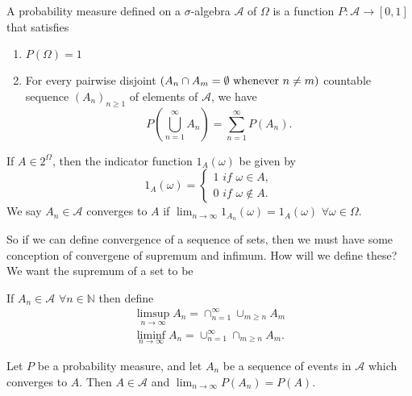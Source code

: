 \documentclass[../main.tex]{subfiles}
\begin{document}
\begin{definition}
A probability measure defined on a $ \sigma $-algebra $\mathcal{A}$ of $\Omega$ is a function $ P: \mathcal{A} \to [0,1] $ that satisfies 
\begin{enumerate}
    \item $P(\Omega)=1$
    \item For every pairwise disjoint $ (A_n \cap A_m = \emptyset \textnormal{ whenever } n \neq m) $ countable sequence $ (A_n)_{n \geq 1} $ of elements of $\mathcal{A}$, we have 
    \[
    P\left(\bigcup^\infty_{n=1}{A_n}\right) = \sum^\infty_{n=1}{P(A_n)}.
    \]
\end{enumerate}
\end{definition}







\begin{definition}
If $A \in 2^\Omega$, then the indicator function $1_A(\omega)$ be given by
\[
1_A(\omega) = 
\begin{cases}
    1 \textit{ if } \omega \in A,\\
    0 \textit{ if } \omega \notin A.
\end{cases}
\]
We say $A_n \in \mathcal{A}$ converges to $A$ if $\lim_{n\to\infty}{1_{A_n}(\omega)} = 1_A(\omega)$ $\forall \omega \in \Omega$.
\end{definition}

\begin{remark}
So if we can define convergence of a sequence of sets, then we must have some conception of 
convergene of supremum and infimum. How will we define these? We want the supremum of a set to be 
\end{remark}

\begin{definition}
If $A_n \in \mathcal{A}$ $\forall n \in \mathbb{N}$ then define
\begin{gather*}
\limsup_{n\to\infty}{A_n} = \cap^\infty_{n=1}\cup_{m \geq n}{A_m}\\
\liminf_{n\to\infty}{A_n} = \cup^\infty_{n=1}\cap_{m\geq n}{A_m}.
\end{gather*}

\end{definition}


\begin{theorem}
Let $P$ be a probability measure, and let $A_n$ be a sequence of events in $\mathcal{A}$ which converges
to $A$. Then $A \in \mathcal{A}$ and $\lim_{n \to \infty}{P(A_n)} = P(A)$.
\end{theorem}
\end{document}
